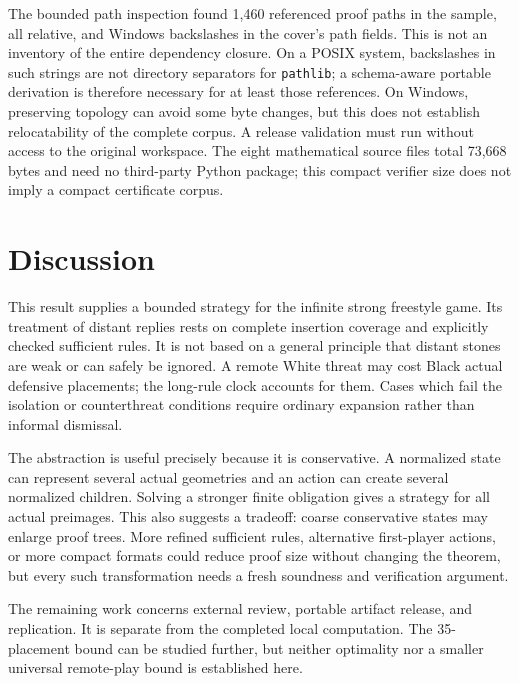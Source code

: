 \documentclass[11pt]{article}
\theoremstyle{definition}
\theoremstyle{remark}
\newcommand{\code}[1]{\texttt{#1}}
\begin{document}
The bounded path inspection found 1,460 referenced proof paths in the
sample, all relative, and Windows backslashes in the cover's path fields.
This is not an inventory of the entire dependency closure. On a POSIX
system, backslashes in such strings are not directory separators for
\code{pathlib}; a schema-aware portable derivation is therefore necessary
for at least those references. On Windows, preserving topology can avoid
some byte changes, but this does not establish relocatability of the
complete corpus. A release validation must run without access to the
original workspace. The eight mathematical source files total 73,668
bytes and need no third-party Python package; this compact verifier size
does not imply a compact certificate corpus.

\section{Discussion}
This result supplies a bounded strategy for the infinite strong freestyle
game. Its treatment of distant replies rests on complete insertion coverage
and explicitly checked sufficient rules. It is not based on a general
principle that distant stones are weak or can safely be ignored. A remote
White threat may cost Black actual defensive placements; the long-rule
clock accounts for them. Cases which fail the isolation or counterthreat
conditions require ordinary expansion rather than informal dismissal.

The abstraction is useful precisely because it is conservative. A
normalized state can represent several actual geometries and an action
can create several normalized children. Solving a stronger finite
obligation gives a strategy for all actual preimages. This also suggests a
tradeoff: coarse conservative states may enlarge proof trees. More
refined sufficient rules, alternative first-player actions, or more
compact formats could reduce proof size without changing the theorem,
but every such transformation needs a fresh soundness and verification
argument.

The remaining work concerns external review, portable artifact release,
and replication. It is separate from the completed local
computation. The 35-placement bound can be studied further, but neither
optimality nor a smaller universal remote-play bound is established here.

\appendix
\end{document}
